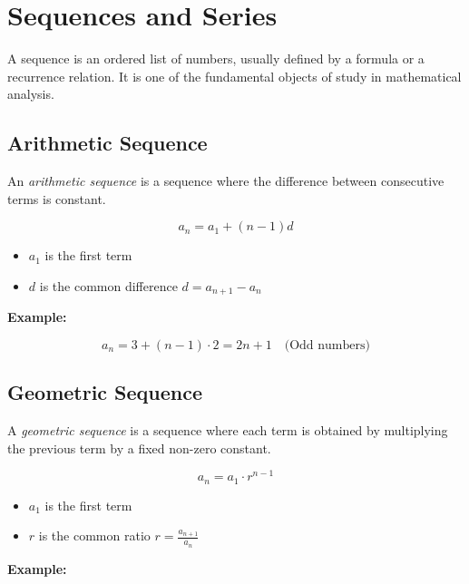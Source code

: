 \newpage
\section{Sequences and Series}

A sequence is an ordered list of numbers, usually defined by a formula or a recurrence relation. It is 
one of the fundamental objects of study in mathematical analysis.

\subsection{Arithmetic Sequence}

An \emph{arithmetic sequence} is a sequence where the difference between consecutive terms is constant.

\[
    a_n = a_1 + (n - 1)d
\]

\begin{itemize}

    \item \(a_1\) is the first term

    \item \(d\) is the common difference \(d = a_{n + 1} - a_{n}\)

\end{itemize}

\textbf{Example:}
\vspace{\baselineskip}

\[
    a_n = 3 + (n - 1) \cdot 2 = 2n + 1 \quad \text{(Odd numbers)}
\]

\subsection{Geometric Sequence}

A \emph{geometric sequence} is a sequence where each term is obtained by multiplying the previous term 
by a fixed non-zero constant.

\[
    a_n = a_1 \cdot r^{n-1}
\]

\begin{itemize}

    \item \(a_1\) is the first term

    \item \(r\) is the common ratio \(r = \frac{a_{n + 1}}{a_n}\)

\end{itemize}

\textbf{Example:}
\vspace{\baselineskip}


